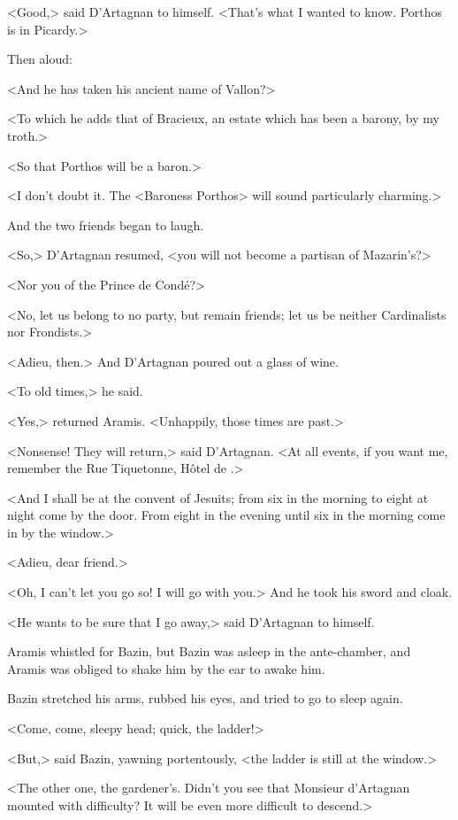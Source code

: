 <Good,> said D'Artagnan to himself. <That's what I wanted to know. Porthos is in Picardy.>

Then aloud:

<And he has taken his ancient name of Vallon?>

<To which he adds that of Bracieux, an estate which has been a barony, by my troth.>

<So that Porthos will be a baron.>

<I don't doubt it. The <Baroness Porthos> will sound particularly charming.>

And the two friends began to laugh.

<So,> D'Artagnan resumed, <you will not become a partisan of Mazarin's?>

<Nor you of the Prince de Condé?>

<No, let us belong to no party, but remain friends; let us be neither Cardinalists nor Frondists.>

<Adieu, then.> And D'Artagnan poured out a glass of wine.

<To old times,> he said.

<Yes,> returned Aramis. <Unhappily, those times are past.>

<Nonsense! They will return,> said D'Artagnan. <At all events, if you want me, remember the Rue Tiquetonne, Hôtel de .>

<And I shall be at the convent of Jesuits; from six in the morning to eight at night come by the door. From eight in the evening until six in the morning come in by the window.>

<Adieu, dear friend.>

<Oh, I can't let you go so! I will go with you.> And he took his sword and cloak.

<He wants to be sure that I go away,> said D'Artagnan to himself.

Aramis whistled for Bazin, but Bazin was asleep in the ante-chamber, and Aramis was obliged to shake him by the ear to awake him.

Bazin stretched his arms, rubbed his eyes, and tried to go to sleep again.

<Come, come, sleepy head; quick, the ladder!>

<But,> said Bazin, yawning portentously, <the ladder is still at the window.>

<The other one, the gardener's. Didn't you see that Monsieur d'Artagnan mounted with difficulty? It will be even more difficult to descend.>

